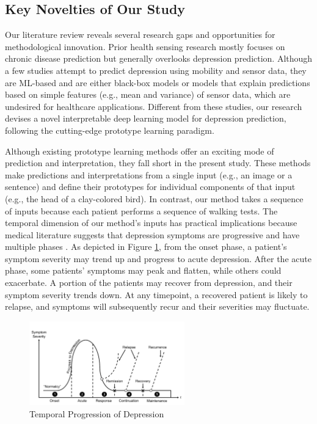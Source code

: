 \documentclass[mnsc]{informs3b} %
\begin{document}
\subsection{Key Novelties of Our Study} \label{sec:lr:tidl}

Our literature review reveals several research gaps and opportunities for methodological innovation. Prior health sensing research mostly focuses on chronic disease prediction but generally overlooks depression prediction. Although a few studies attempt to predict depression using mobility and sensor data, they are ML-based and are either black-box models or models that explain predictions based on simple features (e.g., mean and variance) of sensor data, which are undesired for healthcare applications. Different from these studies, our research devises a novel interpretable deep learning model for depression prediction, following the cutting-edge prototype learning paradigm.


Although existing prototype learning methods offer an exciting mode of prediction and interpretation, they fall short in the present study. These methods make predictions and interpretations from a single input (e.g., an image or a sentence) and define their prototypes for individual components of that input (e.g., the head of a clay-colored bird). 
In contrast, our method takes a sequence of inputs because each patient performs a sequence of walking tests. 
The temporal dimension of our method's inputs has practical implications because
medical literature suggests that depression symptoms are progressive and have multiple phases \citep{ bockting_lifetime_2015,dattani_mental_2021}. As depicted in Figure \ref{fig:depression_trend}, from the onset phase, a patient's symptom severity may trend up and progress to acute depression. After the acute phase, some patients' symptoms may peak and flatten, while others could exacerbate. A portion of the patients may recover from depression, and their symptom severity trends down. At any timepoint, a recovered patient is likely to relapse, and symptoms will subsequently recur and their severities may fluctuate. 
\begin{figure}[h]
    \centering
    \includegraphics[width=0.6\textwidth]{imgs/depression_trend.pdf}
    \caption{Temporal Progression of Depression \citep{bockting_lifetime_2015}}
    \label{fig:depression_trend}
\end{figure}
\end{document}
